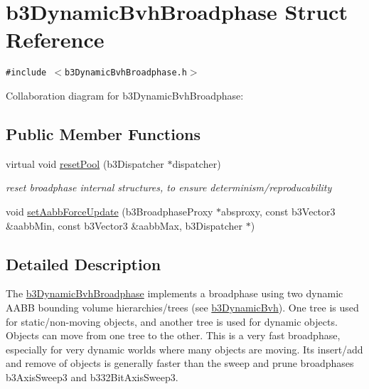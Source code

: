 \hypertarget{structb3_dynamic_bvh_broadphase}{
\section{b3DynamicBvhBroadphase Struct Reference}
\label{structb3_dynamic_bvh_broadphase}
}
{\tt \#include $<$b3DynamicBvhBroadphase.h$>$}

Collaboration diagram for b3DynamicBvhBroadphase:\subsection*{Public Member Functions}
\begin{CompactItemize}
\item 
\hypertarget{structb3_dynamic_bvh_broadphase_a14412970c0f564d3a659710c6d7a4dd}{
virtual void \hyperlink{structb3_dynamic_bvh_broadphase_a14412970c0f564d3a659710c6d7a4dd}{resetPool} (b3Dispatcher $\ast$dispatcher)}
\label{structb3_dynamic_bvh_broadphase_a14412970c0f564d3a659710c6d7a4dd}

\begin{CompactList}\small\item\em reset broadphase internal structures, to ensure determinism/reproducability \item\end{CompactList}\item 
void \hyperlink{structb3_dynamic_bvh_broadphase_c18c206ccd45e8e2f0c817381d6840a0}{setAabbForceUpdate} (b3BroadphaseProxy $\ast$absproxy, const b3Vector3 \&aabbMin, const b3Vector3 \&aabbMax, b3Dispatcher $\ast$)
\end{CompactItemize}


\subsection{Detailed Description}
The \hyperlink{structb3_dynamic_bvh_broadphase}{b3DynamicBvhBroadphase} implements a broadphase using two dynamic AABB bounding volume hierarchies/trees (see \hyperlink{structb3_dynamic_bvh}{b3DynamicBvh}). One tree is used for static/non-moving objects, and another tree is used for dynamic objects. Objects can move from one tree to the other. This is a very fast broadphase, especially for very dynamic worlds where many objects are moving. Its insert/add and remove of objects is generally faster than the sweep and prune broadphases b3AxisSweep3 and b332BitAxisSweep3. 

